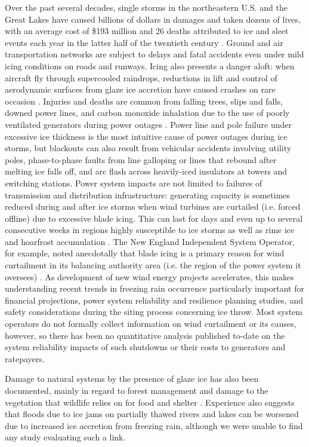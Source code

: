 \documentclass[twocol]{ametsoc}
\begin{document}
Over the past several decades, single storms in the northeastern U.S. and the Great Lakes have caused billions of dollars in damages and taken dozens of lives, with an average cost of \$193 million and 26 deaths attributed to ice and sleet events each year in the latter half of the twentieth century \citep{lott2006tracking, changnon2006severe, ncei2019storm}. Ground and air transportation networks are subject to delays and fatal accidents even under mild icing conditions on roads and runways. Icing also presents a danger aloft: when aircraft fly through supercooled raindrops, reductions in lift and control of aerodynamic surfaces from glaze ice accretion have caused crashes on rare occasion \citep{bernstein2000freezing}. Injuries and deaths are common from falling trees, slips and falls, downed power lines, and carbon monoxide inhalation due to the use of poorly ventilated generators during power outages \citep{daley2000outbreak}. Power line and pole failure under excessive ice thickness is the most intuitive cause of power outages during ice storms, but blackouts can also result from vehicular accidents involving utility poles, phase-to-phase faults from line galloping or lines that rebound after melting ice falls off, and arc flash across heavily-iced insulators at towers and switching stations. Power system impacts are not limited to failures of transmission and distribution infrastructure: generating capacity is sometimes reduced during and after ice storms when wind turbines are curtailed (i.e. forced offline) due to excessive blade icing. This can last for days and even up to several consecutive weeks in regions highly susceptible to ice storms as well as rime ice and hoarfrost accumulation \citep{davis2014forecast}. The New England Independent System Operator, for example, noted anecdotally that blade icing is a primary reason for wind curtailment in its balancing authority area (i.e. the region of the power system it oversees) \citep{bird2014wind}. As development of new wind energy projects accelerates, this makes understanding recent trends in freezing rain occurrence particularly important for financial projections, power system reliability and resilience planning studies, and safety considerations during the siting process concerning ice throw. Most system operators do not formally collect information on wind curtailment or its causes, however, so there has been no quantitative analysis published to-date on the system reliability impacts of such shutdowns or their costs to generators and ratepayers.

Damage to natural systems by the presence of glaze ice has also been documented, mainly in regard to forest management and damage to the vegetation that wildlife relies on for food and shelter \citep{pellikka2000modelling,proulx2001relationship}. Experience also suggests that floods due to ice jams on partially thawed rivers and lakes can be worsened due to increased ice accretion from freezing rain, although we were unable to find any study evaluating such a link. 
\end{document}
